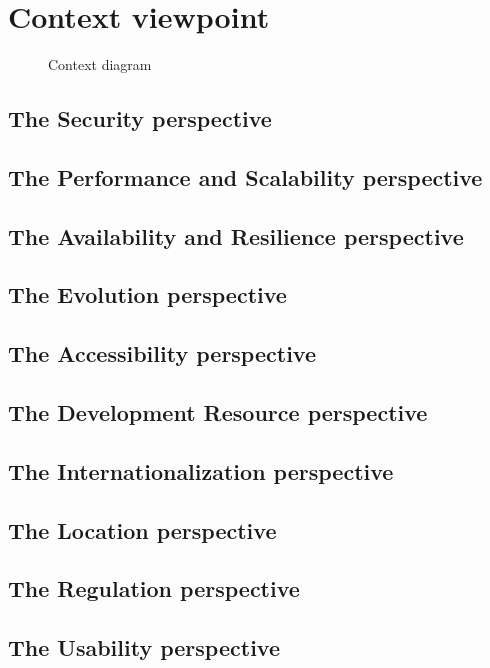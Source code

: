\section{Context viewpoint}

\begin{figure}[H]
  \label{fig:viewpoint-context-main}
  \caption{Context diagram}
\end{figure}

\subsection{The Security perspective}

\subsection{The Performance and Scalability perspective}

\subsection{The Availability and Resilience perspective}

\subsection{The Evolution perspective}

\subsection{The Accessibility perspective}

\subsection{The Development Resource perspective}

\subsection{The Internationalization perspective}

\subsection{The Location perspective}

\subsection{The Regulation perspective}

\subsection{The Usability perspective}
